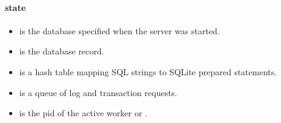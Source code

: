 \paragraph* {state}
\begin{itemize}
\item {} is the database specified when the server was
  started.
\item {} is the database record.
\item {} is a hash table mapping SQL strings to SQLite
  prepared statements.
\item {} is a queue of log and transaction requests.
\item {} is the pid of the active worker or .
\end{itemize}

